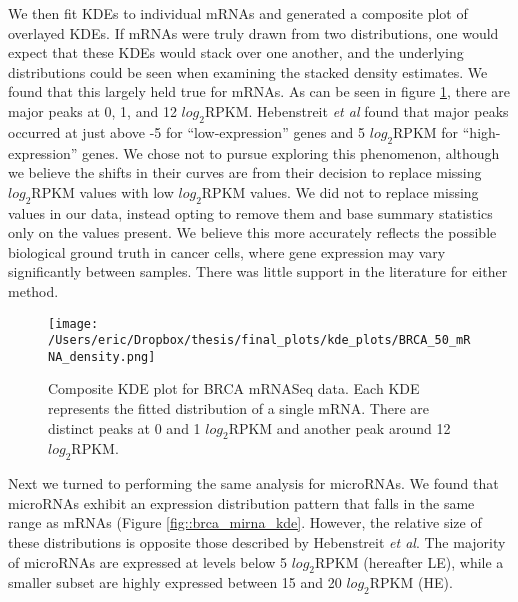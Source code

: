 \documentclass[12pt]{report}
\begin{document}
We then fit KDEs to individual mRNAs and generated a composite plot of overlayed KDEs. If mRNAs were truly drawn from two distributions, one would expect that these
KDEs would stack over one another, and the underlying distributions could be seen when examining the stacked density estimates. We found that this largely held true for mRNAs.
As can be seen in figure \ref{fig::brca_mrna_kde}, there are major peaks at 0, 1, and 12 $log_{2} \text{RPKM}$. Hebenstreit \textit{et al} found that major peaks occurred at just above -5 
for ``low-expression'' genes and 5 $log_{2} \text{RPKM}$ for ``high-expression'' genes. We chose not to pursue exploring this phenomenon, although we believe the shifts in their curves
are from their decision to replace missing $log_{2} \text{RPKM}$ values with low $log_{2} \text{RPKM}$ values. We did not to replace missing values in our data, instead opting to remove them
and base summary statistics only on the values present. We believe this more accurately reflects the possible biological ground truth in cancer cells, where gene expression may vary
significantly between samples. There was little support in the literature for either method. %

\begin{figure}[H]
\centering
 \texttt{[image: /Users/eric/Dropbox/thesis/final\_plots/kde\_plots/BRCA\_50\_mRNA\_density.png]}
 \caption{Composite KDE plot for BRCA mRNASeq data. Each KDE represents the fitted distribution of a single mRNA. There are distinct peaks at 0 and 1 $log_{2} \text{RPKM}$ and another peak around 12 $log_{2} \text{RPKM}$.}
 \label{fig::brca_mrna_kde}
\end{figure}



Next we turned to performing the same analysis for microRNAs. We found that microRNAs exhibit an expression distribution pattern that falls in the same range as mRNAs (Figure \ref{fig::brca_mirna_kde}. However,
the relative size of these distributions is opposite those described by Hebenstreit \textit{et al}. The majority of microRNAs are expressed at levels below 5 $log_{2} \text{RPKM}$ (hereafter LE), while a smaller subset are highly expressed
between 15 and 20 $log_{2} \text{RPKM}$ (HE).
\end{document}

